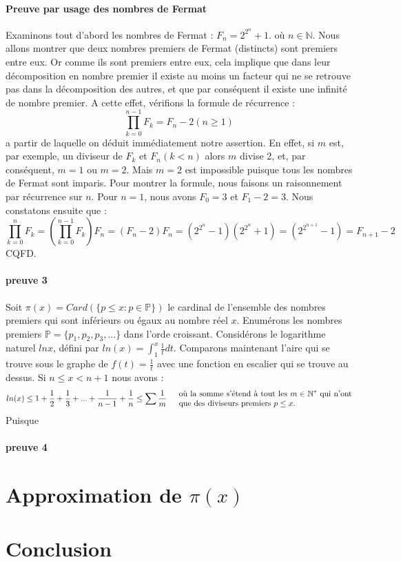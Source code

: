 \documentclass[a4paper]{article}
\begin{document}
   \subsection{Preuve par usage des nombres de Fermat}
    Examinons tout d'abord les nombres de Fermat : $F_n = 2^{2^n} + 1 $. où $n \in \mathbb{N}$. Nous allons montrer que deux nombres premiers de Fermat (distincts) sont premiers entre eux.
    Or comme ils sont premiers entre eux, cela implique que dans leur décomposition en nombre premier il existe au moins un facteur qui ne se retrouve pas dans la décomposition des autres,
    et que par conséquent il existe une infinité de nombre premier. A cette effet, vérifions la formule de récurrence : $$ \prod_{k=0}^{n-1} F_k = F_n - 2 (n \geq 1)$$
    a partir de laquelle on déduit immédiatement notre assertion. En effet, si $m$ est, par exemple, un diviseur de $F_k$ et $F_n (k < n)$ alors $m$ divise 2, et, par conséquent, $m = 1$
    ou $m = 2$. Mais $m = 2$ est impossible puisque tous les nombres de Fermat sont imparis. Pour montrer la formule, nous faisons un raisonnement par récurrence sur $n$. Pour $n = 1$,
    nous avons $F_0 = 3$ et $F_1  - 2 = 3$. Nous constatons ensuite que : $$ \prod_{k=0}^{n} F_k = \left ( \prod_{k=0}^{n - 1} F_k \right ) F_n = (F_n - 2)F_n = (2^{2^n} - 1)
    (2^{2^n} + 1) = (2^{2^{n + 1}} - 1) = F_{n + 1} - 2$$
    CQFD.
  \subsection{preuve 3}
    Soit $ \pi(x) = Card(\{p \leq x : p \in \mathbb{P}\}) $ le cardinal de l'ensemble des nombres premiers qui sont inférieurs
    ou égaux au nombre réel $x$. Enumérons les nombres premiers $\mathbb{P} = \{p_1, p_2, p_3, ...\}$ dans l'orde
    croissant. Considérons le logarithme naturel $ln x$, défini par $ln(x)= \int_1^x \frac{1}{t}dt$. Comparons
    maintenant l'aire qui se trouve sous le graphe de $f(t) = \frac{1}{t}$ avec une fonction en escalier qui
    se trouve au dessus. Si $n \leq x < n + 1$ nous avons :
    $$ln(x) \leq 1 + \frac{1}{2} + \frac{1}{3} + ... + \frac{1}{n -1} + \frac{1}{n} \leq \sum \frac{1}{m}
    \text{\indent\parbox{50ex}{où la somme s'étend à tout les $m \in \mathbb{N}^*$ 
    qui n'ont que des diviseurs premiers $p \leq x$.}}$$
    Puisque
  \subsection{preuve 4}

\part{Approximation de $\pi(x)$}

\part*{Conclusion}
%
%
\end{document}

